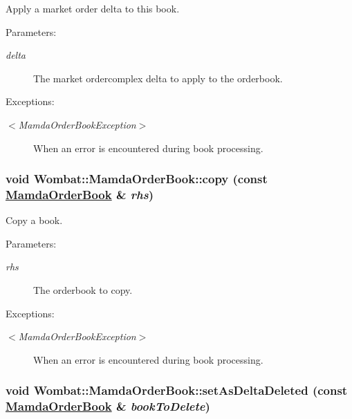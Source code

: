 Apply a market order delta to this book. 

\begin{Desc}
\item[Parameters:]
\begin{description}
\item[{\em delta}]The market ordercomplex delta to apply to the orderbook.\end{description}
\end{Desc}
\begin{Desc}
\item[Exceptions:]
\begin{description}
\item[{\em $<$Mamda\-Order\-Book\-Exception$>$}]When an error is encountered during book processing. \end{description}
\end{Desc}
\hypertarget{classWombat_1_1MamdaOrderBook_75693551c298313eb92601da367abd59}{
\subsubsection[copy]{\setlength{\rightskip}{0pt plus 5cm}void Wombat::Mamda\-Order\-Book::copy (const \hyperlink{classWombat_1_1MamdaOrderBook}{Mamda\-Order\-Book} \& {\em rhs})}}
\label{classWombat_1_1MamdaOrderBook_75693551c298313eb92601da367abd59}


Copy a book. 

\begin{Desc}
\item[Parameters:]
\begin{description}
\item[{\em rhs}]The orderbook to copy.\end{description}
\end{Desc}
\begin{Desc}
\item[Exceptions:]
\begin{description}
\item[{\em $<$Mamda\-Order\-Book\-Exception$>$}]When an error is encountered during book processing. \end{description}
\end{Desc}
\hypertarget{classWombat_1_1MamdaOrderBook_50f867044fee92e05d230205b444d31d}{
\subsubsection[setAsDeltaDeleted]{\setlength{\rightskip}{0pt plus 5cm}void Wombat::Mamda\-Order\-Book::set\-As\-Delta\-Deleted (const \hyperlink{classWombat_1_1MamdaOrderBook}{Mamda\-Order\-Book} \& {\em book\-To\-Delete})}}
\label{classWombat_1_1MamdaOrderBook_50f867044fee92e05d230205b444d31d}


